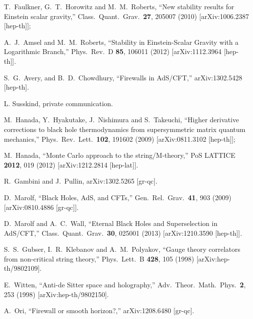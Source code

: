\documentclass[12pt]{article}
\begin{document}
\begin{thebibliography}{99}
   T.~Faulkner, G.~T.~Horowitz and M.~M.~Roberts,
  ``New stability results for Einstein scalar gravity,''
  Class.\ Quant.\ Grav.\  {\bf 27}, 205007 (2010)
  [arXiv:1006.2387 [hep-th]];

    A.~J.~Amsel and M.~M.~Roberts,
  ``Stability in Einstein-Scalar Gravity with a Logarithmic Branch,''
  Phys.\ Rev.\ D {\bf 85}, 106011 (2012)
  [arXiv:1112.3964 [hep-th]].


  S.~G.~Avery, and B.~D.~Chowdhury,
  ``Firewalls in AdS/CFT,''
  arXiv:1302.5428 [hep-th].


L. Susskind, private communication.

  M.~Hanada, Y.~Hyakutake, J.~Nishimura and S.~Takeuchi,
  ``Higher derivative corrections to black hole thermodynamics from supersymmetric matrix quantum mechanics,''
  Phys.\ Rev.\ Lett.\  {\bf 102}, 191602 (2009)
  [arXiv:0811.3102 [hep-th]];

  M.~Hanada,
  ``Monte Carlo approach to the string/M-theory,''
  PoS LATTICE {\bf 2012}, 019 (2012)
  [arXiv:1212.2814 [hep-lat]].

  R.~Gambini and J.~Pullin,
  arXiv:1302.5265 [gr-qc].


  D.~Marolf,
  ``Black Holes, AdS, and CFTs,''
  Gen.\ Rel.\ Grav.\  {\bf 41}, 903 (2009)
  [arXiv:0810.4886 [gr-qc]].

  D.~Marolf and A.~C.~Wall,
  ``Eternal Black Holes and Superselection in AdS/CFT,''
  Class.\ Quant.\ Grav.\  {\bf 30}, 025001 (2013)
  [arXiv:1210.3590 [hep-th]].

  S.~S.~Gubser, I.~R.~Klebanov and A.~M.~Polyakov,
  ``Gauge theory correlators from non-critical string theory,''
  Phys.\ Lett.\  B {\bf 428}, 105 (1998)
  [arXiv:hep-th/9802109].

  E.~Witten,
  ``Anti-de Sitter space and holography,''
  Adv.\ Theor.\ Math.\ Phys.\  {\bf 2}, 253 (1998)
  [arXiv:hep-th/9802150].


  A.~Ori,
  ``Firewall or smooth horizon?,''
  arXiv:1208.6480 [gr-qc].


\end{thebibliography}
\end{document}
